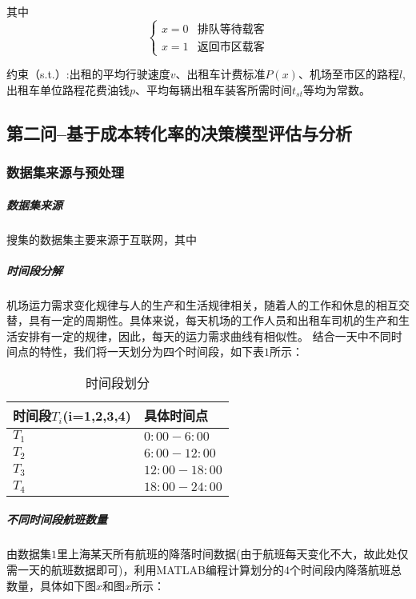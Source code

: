 \documentclass[withoutpreface,bwprint]{cumcmthesis} %
\begin{document}
其中
\begin{equation}
\begin{cases}
x=0  &  \mbox{排队等待载客}  \\
x=1  &   \mbox{返回市区载客}
\end{cases}
\end{equation}


约束（s.t.）:出租的平均行驶速度$v$、出租车计费标准$P(x)$、机场至市区的路程$l$,出租车单位路程花费油钱$p$、平均每辆出租车装客所需时间$t_{st}$等均为常数。

\subsection{第二问--基于成本转化率的决策模型评估与分析}
\subsubsection{数据集来源与预处理}


\subparagraph{数据集来源}
搜集的数据集主要来源于互联网，其中



\subparagraph{时间段分解}机场运力需求变化规律与人的生产和生活规律相关，随着人的工作和休息的相互交替，具有一定的周期性。具体来说，每天机场的工作人员和出租车司机的生产和生活安排有一定的规律，因此，每天的运力需求曲线有相似性\cite{bib:four}。
结合一天中不同时间点的特性，我们将一天划分为四个时间段，如下表$1$所示：
\newpage
\begin{table}[htbp] 
\caption{时间段划分}  
	\centering
	\begin{tabular}{p{7.5cm}<{\centering} p{7.5cm}<{\centering}} 
		\toprule[1.5pt]
		时间段$T_i$(i=1,2,3,4) & 具体时间点\\ 
		\midrule 

	$T_1$		& $0:00-6:00$  \\
	$T_2$		& $6:00-12:00$  \\
	$T_3$		& $12:00-18:00$  \\
	$T_4$		&  $18:00-24:00$  \\	
  	

		\bottomrule[1.5pt] 
	\end{tabular} 

\end{table}

\subparagraph{不同时间段航班数量}由数据集$1$里上海某天所有航班的降落时间数据(由于航班每天变化不大，故此处仅需一天的航班数据即可)，利用MATLAB编程计算划分的$4$个时间段内降落航班总数量，具体如下图$x$和图$x$所示：
\end{document}
